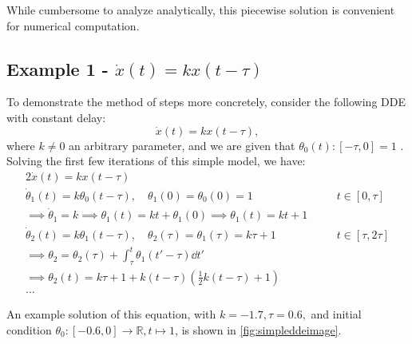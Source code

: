 \documentclass[12pt]{article}
\begin{document}
While cumbersome to analyze analytically, this piecewise solution is convenient for numerical computation.
\subsection{Example 1 - $\dot{x}(t) = kx(t - \tau)$}

To demonstrate the method of steps more concretely, consider the following DDE with constant delay: \begin{equation}
    \dot{x}(t) = kx(t- \tau),
\end{equation}
where $k \neq 0$ an arbitrary parameter, and we are given that $\theta_0(t):[-\tau, 0] = 1$ \cite{DDEtext}. Solving the first few iterations of this simple model, we have:
\begin{alignat}{2}
    \dot{x}(t) = kx(t-\tau) && \\
    \dot{\theta}_1(t) = k \theta_0(t-\tau), \quad \theta_1(0) = \theta_0(0) = 1 && \quad t \in [0, \tau]\\
    \implies \dot{\theta}_1 = k \implies \theta_1(t) = kt + \theta_1(0) \implies \theta_1(t)= kt + 1\\
    \dot{\theta}_2(t) = k \theta_1(t - \tau), \quad \theta_2(\tau) =\theta_1(\tau) = k \tau + 1 && \quad t \in [\tau, 2\tau]\\
    \implies \theta_2 = \theta_2(\tau) + \int_{\tau}^{t} \theta_1(t' - \tau) \dd{t'}\\
    \implies \theta_2(t) = k\tau + 1 +k(t - \tau)(\frac{1}{2}k(t - \tau) + 1)\\
    \dots
\end{alignat}

An example solution of this equation, with $k = -1.7, \tau = 0.6,$ and initial condition $\theta_0:[-0.6, 0] \to \mathbb{R}, t \mapsto 1$, is shown in \cref{fig:simpleddeimage}.
\end{document}
